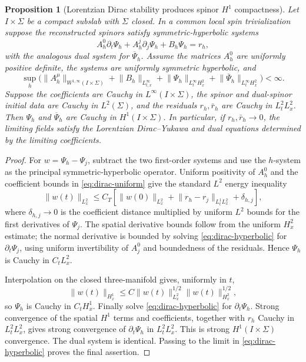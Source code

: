 \documentclass[11pt]{article}
\numberwithin{equation}{section}
\newtheorem{proposition}[proposition]{Proposition}
\theoremstyle{definition}
\theoremstyle{remark}
\newcommand{\norm}[1]{\lVert#1\rVert}
\newcommand{\bPsi}{\overline\Psi}
\begin{document}
\begin{proposition}[Lorentzian Dirac stability produces spinor $H^1$ compactness]
\label{prop:dirac-stability}
Let $I\times\Sigma$ be a compact subslab with $\Sigma$ closed. In a common local spin trivialization suppose the reconstructed spinors satisfy symmetric-hyperbolic systems
\begin{equation}
 A_h^0\partial_t\Psi_h+A_h^j\partial_j\Psi_h+B_h\Psi_h=r_h,
 \label{eq:dirac-hyperbolic}
\end{equation}
with the analogous dual system for $\bPsi_h$. Assume the matrices $A_h^0$ are uniformly positive definite, the systems are uniformly symmetric hyperbolic, and
\begin{equation}
 \sup_h\bigl(
 \norm{A_h^\mu}_{W^{1,\infty}(I\times\Sigma)}
 +\norm{B_h}_{L^\infty_{t,x}}
 +\norm{\Psi_h}_{L^\infty_tH^2_x}
 +\norm{\bPsi_h}_{L^\infty_tH^2_x}
 \bigr)<\infty.
 \label{eq:dirac-uniform}
\end{equation}
Suppose the coefficients are Cauchy in $L^\infty(I\times\Sigma)$, the spinor and dual-spinor initial data are Cauchy in $L^2(\Sigma)$, and the residuals $r_h,\bar r_h$ are Cauchy in $L^2_tL^2_x$. Then $\Psi_h$ and $\bPsi_h$ are Cauchy in $H^1(I\times\Sigma)$. In particular, if $r_h,\bar r_h\to0$, the limiting fields satisfy the Lorentzian Dirac--Yukawa and dual equations determined by the limiting coefficients.
\end{proposition}
\begin{proof}
For $w=\Psi_h-\Psi_j$, subtract the two first-order systems and use the $h$-system as the principal symmetric-hyperbolic operator. Uniform positivity of $A_h^0$ and the coefficient bounds in \eqref{eq:dirac-uniform} give the standard $L^2$ energy inequality
\begin{equation}
 \norm{w(t)}_{L^2_x}
 \le C_T\left[
 \norm{w(0)}_{L^2_x}
 +\norm{r_h-r_j}_{L^1_tL^2_x}
 +\delta_{h,j}
 \right],
 \label{eq:dirac-L2-stability}
\end{equation}
where $\delta_{h,j}\to0$ is the coefficient distance multiplied by uniform $L^2$ bounds for the first derivatives of $\Psi_j$. The spatial derivative bounds follow from the uniform $H^2_x$ estimate; the normal derivative is bounded by solving \eqref{eq:dirac-hyperbolic} for $\partial_t\Psi_j$, using uniform invertibility of $A_j^0$ and boundedness of the residuals. Hence $\Psi_h$ is Cauchy in $C_tL^2_x$.

Interpolation on the closed three-manifold gives, uniformly in $t$,
\[
 \norm{w(t)}_{H^1_x}
 \le C\norm{w(t)}_{L^2_x}^{1/2}
        \norm{w(t)}_{H^2_x}^{1/2},
\]
so $\Psi_h$ is Cauchy in $C_tH^1_x$. Finally solve \eqref{eq:dirac-hyperbolic} for $\partial_t\Psi_h$. Strong convergence of the spatial $H^1$ terms and coefficients, together with $r_h$ Cauchy in $L^2_tL^2_x$, gives strong convergence of $\partial_t\Psi_h$ in $L^2_tL^2_x$. This is strong $H^1(I\times\Sigma)$ convergence. The dual system is identical. Passing to the limit in \eqref{eq:dirac-hyperbolic} proves the final assertion.
\end{proof}
\end{document}

